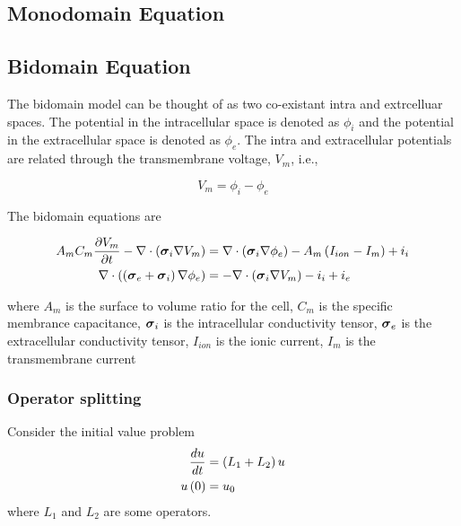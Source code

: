 \subsection{Monodomain Equation}

\subsection{Bidomain Equation}

The bidomain model can be thought of as two co-existant intra and extrcelluar
spaces. The potential in the intracellular space is denoted as
$\phi_{i}$ and the potential in the extracellular space is denoted as
$\phi_{e}$. The intra and extracellular potentials are related through the
transmembrane voltage, $V_{m}$, i.e.,

\begin{equation}
  V_{m}=\phi_{i}-\phi_{e}
  \label{eqn:transmembranevoltage}
\end{equation} 

The bidomain equations are

\begin{align}
  A_{m}C_{m} \dfrac{\partial V_{m}}{\partial t} - \nabla\cdot\left( \boldsymbol{\sigma}_{i}\nabla{V_{m}} \right) &= \nabla\cdot\left( \boldsymbol{\sigma}_{i}\nabla{\phi_{e}} \right) -A_{m}\left( I_{ion}-I_{m} \right)+i_{i} \label{eqn:biodomain1}
  \\
   \nabla\cdot\left( \left( \boldsymbol{\sigma}_{e}+\boldsymbol{\sigma}_{i} \right)\nabla{\phi_{e}} \right) &=- \nabla\cdot\left( \boldsymbol{\sigma}_{i}\nabla{V_{m}} \right) -i_{i}+i_{e}
  \label{eqn:bidomain2}
\end{align}

where $A_{m}$ is the surface to volume ratio for the cell, $C_{m}$ is
the specific membrance capacitance, $\boldsymbol{\sigma}_{i}$ is the intracellular
conductivity tensor, $\boldsymbol{\sigma}_{e}$ is the extracellular
conductivity tensor, $I_{ion}$ is the ionic current, $I_{m}$ is the
transmembrane current

\subsubsection{Operator splitting}

Consider the initial value problem
\begin{align}
   \dfrac{ d u}{d t} &=\left( L_{1}+L_{2} \right)u \\
   u\left( 0 \right) &=u_{0}
\end{align}
where $L_{1}$ and $L_{2}$ are some operators.

